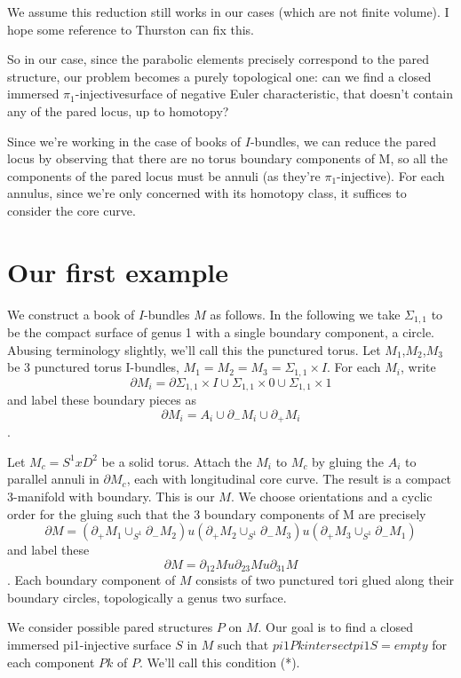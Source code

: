 \documentclass[12pt]{amsart}
\theoremstyle{definition}
\newcommand{\x}{\times}
\newcommand{\bd}{\partial}
\newcommand{\Si}{\Sigma}
\newcommand{\piinj}{$\pi_1$-injective}
\begin{document}
We assume this reduction still works in our cases (which are not finite
volume). I hope some reference to Thurston can fix this.

So in our case, since the parabolic elements precisely correspond to the pared
structure, our problem becomes a purely topological one: can we find a closed
immersed \piinj surface of negative Euler characteristic, that
doesn't contain any of the pared locus, up to homotopy?

Since we're working in the case of books of $I$-bundles, we can reduce the pared
locus by observing that there are no torus boundary components of M, so all the
components of the pared locus must be annuli (as they're \piinj). For
each annulus, since we're only concerned with its homotopy class, it suffices
to consider the core curve.

\section{Our first example}

We construct a book of $I$-bundles $M$ as follows. In the following we take
$\Si_{1,1}$ to be the compact surface of genus 1 with a single boundary
component, a circle.  Abusing terminology slightly, we'll call this the
punctured torus.  Let $M_1$,$M_2$,$M_3$ be 3 punctured torus I-bundles,
$M_1=M_2=M_3=\Si_{1,1}\x I$. For each $M_i$, write
\[
\bd M_i = \bd \Si_{1,1}\x I \cup \Si_{1,1}\x0 \cup \Si_{1,1} \x 1
\]
and label these boundary pieces as
\[
\bd M_i = A_i \cup \bd_- M_i \cup \bd_+M_i
\].

Let $M_c = S^1xD^2$ be a solid torus. Attach the $M_i$ to $M_c$ by gluing the
$A_i$ to parallel annuli in $\bd M_c$, each with longitudinal core curve. The
result is a compact 3-manifold with boundary. This is our $M$. We choose
orientations and a cyclic order for the gluing such that the 3 boundary
components of M are precisely
\[
\bd M = (\bd_+M_1 \cup_{S^1} \bd_-M_2) u (\bd_+M_2 \cup_{S^1} \bd_-M_3)
u (\bd_+M_3 \cup_{S^1} \bd_-M_1)
\]
and label these
\[
\bd M=\bd_{12}M u \bd_{23}Mu \bd_{31}M
\].
Each boundary
component of $M$ consists of two punctured tori glued along their boundary
circles, topologically a genus two surface.

We consider possible pared structures $P$ on $M$. Our goal is to find a closed
immersed pi1-injective surface $S$ in $M$ such that $pi1Pk intersect pi1S
= empty$
for each component $Pk$ of $P$. We'll call this condition (*).
\end{document}

